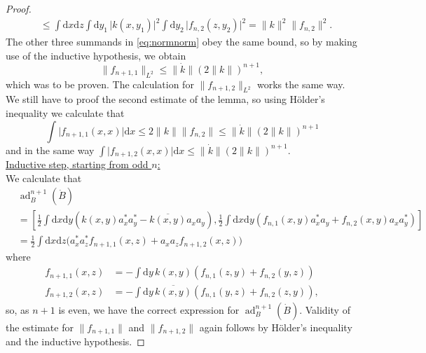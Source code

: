 \documentclass[11pt,a4paper,DIV11]{scrartcl}	%
\newcommand{\ad}{\operatorname{ad}}	%
\newcommand{\di}{\textrm{d}}		%
\newcommand{\cc}[1]{\overline{#1}}	%
\newcommand{\norm}[1]{\lVert#1\rVert}	%
\newcommand{\bd}{\begin{displaymath}}			%
\newcommand{\ed}{\end{displaymath}}
\newcommand{\eqr}[1]{\eqref{eq:#1}}			%
\begin{document}
\begin{proof}
\begin{align*}
& \leq \int \di x \di z \int \di y_1\,\lvert k(x,y_1) \rvert^2 \int \di y_2\,\lvert f_{n,2}(z,y_2) \rvert^2 = \norm{k}^2 \norm{f_{n,2}}^2. 
\end{align*}
The other three summands in \eqr{normnorm} obey the same bound, so by making use of the inductive hypothesis, we obtain
\bd
\norm{f_{n+1,1}}_{L^2} \leq \norm{\dot k} (2\norm{k})^{n+1},
\ed
which was to be proven. The calculation for $\norm{f_{n+1,2}}_{L^2}$ works the same way. We still have to proof the second estimate of the lemma, so using H\"older's inequality we calculate that
\[
\int \lvert f_{n+1,1}(x,x) \rvert \di x \leq 2\norm{k} \norm{f_{n,2}} \leq \norm{\dot k} (2\norm{k})^{n+1}
\]
and in the same way $\int \lvert f_{n+1,2}(x,x) \rvert \di x \leq \norm{\dot k}(2\norm{k})^{n+1}$.\vspace{1em}\\
\underline{Inductive step, starting from odd $n$:}\\
We calculate that%
\begin{align*}
& \ad^{n+1}_B(\dot B)\\
& = \left[ \frac{1}{2}\int \di x \di y \left( k(x,y)a^\ast_x a^\ast_y - \cc{k(x,y)} a_x a_y \right) , \frac{1}{2}\int \di x\di y \left( f_{n,1}(x,y) a^\ast_x a_y + f_{n,2}(x,y) a_x a^\ast_y \right) \right] \\
& = \frac{1}{2} \int \di x\di z \big( a^\ast_x a^\ast_z f_{n+1,1}(x,z) + a_x a_z f_{n+1,2}(x,z) \big)
\end{align*}
where
\begin{equation}
\label{eq:odd}
\begin{split}
f_{n+1,1}(x,z) & = - \int \di y\, k(x,y)\left( f_{n,1}(z,y) + f_{n,2}(y,z) \right) \\
f_{n+1,2}(x,z) & = - \int \di y\, \cc{k(x,y)}\left( f_{n,1}(y,z) + f_{n,2}(z,y) \right),
\end{split}
\end{equation}
so, as $n+1$ is even, we have the correct expression for $\ad^{n+1}_B(\dot B)$. Validity of the estimate for $\norm{f_{n+1,1}}$ and $\norm{f_{n+1,2}}$ again follows by H\"older's inequality and the inductive hypothesis.
\end{proof}
\end{document}
